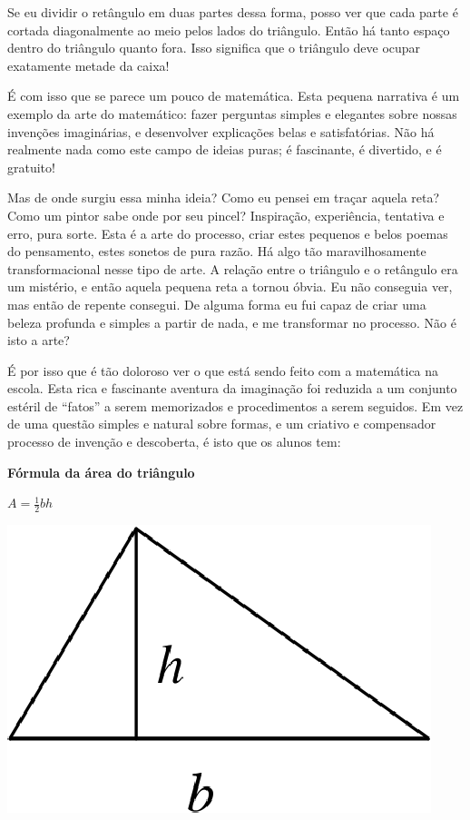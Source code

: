 \documentclass[a4paper,oneside,12pt,notitlepage]{article}
\begin{document}
Se eu dividir o retângulo em duas partes dessa forma, posso ver que cada parte é cortada diagonalmente ao meio pelos lados do triângulo.
Então há tanto espaço dentro do triângulo quanto fora.
Isso significa que o triângulo deve ocupar exatamente metade da caixa!

É com isso que se parece um pouco de matemática. %
Esta pequena narrativa é um exemplo da arte do matemático: fazer perguntas simples e elegantes sobre nossas invenções imaginárias, e desenvolver explicações belas e satisfatórias.
Não há realmente nada como este campo de ideias puras; é fascinante, é divertido, e é gratuito! %

Mas de onde surgiu essa minha ideia?
Como eu pensei em traçar aquela reta?
Como um pintor sabe onde por seu pincel?
Inspiração, experiência, tentativa e erro, pura sorte.
Esta é a arte do processo, criar estes pequenos e belos poemas do pensamento, estes sonetos de pura razão. %
Há algo tão maravilhosamente transformacional nesse tipo de arte.
A relação entre o triângulo e o retângulo era um mistério, e então aquela pequena reta a tornou óbvia.
Eu não conseguia ver, mas então de repente consegui.
De alguma forma eu fui capaz de criar uma beleza profunda e simples a partir de nada, e me transformar no processo.
Não é isto a arte? %

É por isso que é tão doloroso ver o que está sendo feito com a matemática na escola.
Esta rica e fascinante aventura da imaginação foi reduzida a um conjunto estéril de ``fatos'' a serem memorizados e procedimentos a serem seguidos.
Em vez de uma questão simples e natural sobre formas, e um criativo e compensador processo de invenção e descoberta, é isto que os alunos tem:

\vspace{1em}

\begin{minipage}[c]{0.45\linewidth}
	\centering
	\textbf{Fórmula da área do triângulo}

	$A=\frac12 b h$
\end{minipage}
\hspace{0.5em}
\begin{minipage}[c]{0.45\linewidth}
	\centering
	\includegraphics{triangle2.eps}
\end{minipage}
\end{document}
